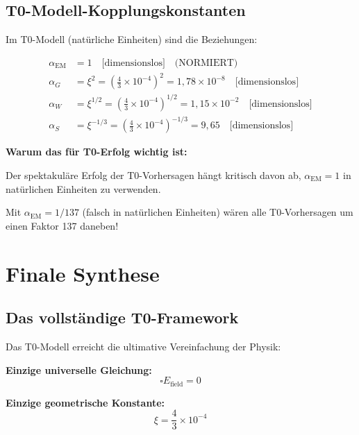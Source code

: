 \documentclass[12pt,a4paper]{report}
\begin{document}
	\subsection{T0-Modell-Kopplungskonstanten}
	\label{subsec:t0_coupling_corrected}
	
	Im T0-Modell (natürliche Einheiten) sind die Beziehungen:
	
	\begin{align}
		\alpha_{\text{EM}} &= 1 \quad \text{[dimensionslos]} \quad \text{(NORMIERT)} \\
		\alpha_G &= \xi^2 = \left(\frac{4}{3} \times 10^{-4}\right)^2 = 1,78 \times 10^{-8} \quad \text{[dimensionslos]} \\
		\alpha_W &= \xi^{1/2} = \left(\frac{4}{3} \times 10^{-4}\right)^{1/2} = 1,15 \times 10^{-2} \quad \text{[dimensionslos]} \\
		\alpha_S &= \xi^{-1/3} = \left(\frac{4}{3} \times 10^{-4}\right)^{-1/3} = 9,65 \quad \text{[dimensionslos]}
	\end{align}
	
	\textbf{Warum das für T0-Erfolg wichtig ist:}
	
	\begin{tcolorbox}[colback=green!10!white,colframe=green!75!black,title=T0-ERFOLG ERKLÄRT]
		Der spektakuläre Erfolg der T0-Vorhersagen hängt kritisch davon ab, $\alpha_{\text{EM}} = 1$ in natürlichen Einheiten zu verwenden.
		
		Mit $\alpha_{\text{EM}} = 1/137$ (falsch in natürlichen Einheiten) wären alle T0-Vorhersagen um einen Faktor 137 daneben!
	\end{tcolorbox}
	
	\section{Finale Synthese}
	\label{sec:final_synthesis}
	
	\subsection{Das vollständige T0-Framework}
	\label{subsec:complete_framework}
	
	Das T0-Modell erreicht die ultimative Vereinfachung der Physik:
	
	\textbf{Einzige universelle Gleichung:}
	\begin{equation}
		\square E_{\text{field}} = 0
	\end{equation}
	
	\textbf{Einzige geometrische Konstante:}
	\begin{equation}
		\xi = \frac{4}{3} \times 10^{-4}
	\end{equation}
	
\end{document}
